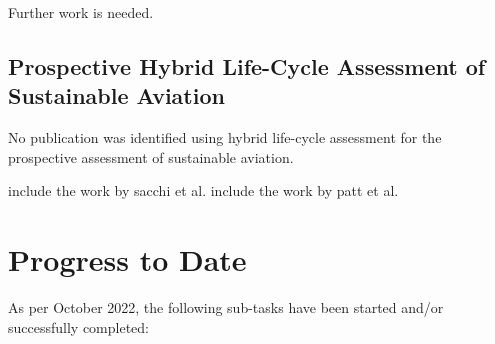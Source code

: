 \documentclass{article}
\begin{document}
        Further work is needed.

    \subsection{Prospective Hybrid Life-Cycle Assessment of Sustainable Aviation}
    
        No publication was identified using hybrid life-cycle assessment for the prospective assessment of sustainable aviation.
        
        include the work by sacchi et al.
        include the work by patt et al.
        

\newpage
\section{Progress to Date}

    As per October 2022, the following sub-tasks have been started and/or successfully completed:
    
\end{document}
